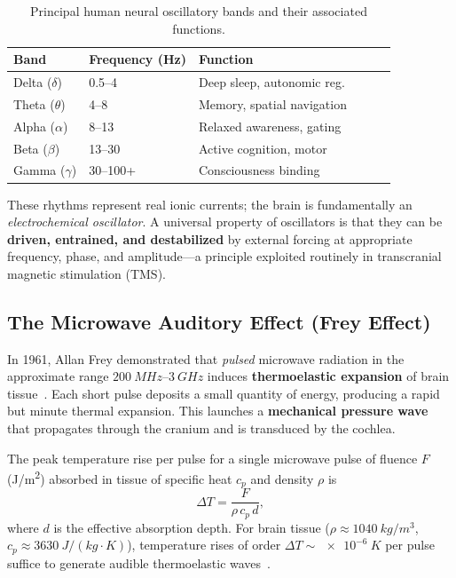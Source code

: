 \documentclass[aps,prl,twocolumn,superscriptaddress,showpacs]{revtex4-2}
\begin{document}
\begin{table}[h]
\caption{\label{tab:bands}
Principal human neural oscillatory bands and their associated functions.}
\begin{tabular}{llllll}
\toprule
\textrm{Band} & \textrm{Frequency (Hz)} & \textrm{Function} \\
\midrule
Delta ($\delta$)  & 0.5--4   & Deep sleep, autonomic reg. \\
Theta ($\theta$)  & 4--8     & Memory, spatial navigation \\
Alpha ($\alpha$)  & 8--13    & Relaxed awareness, gating \\
Beta ($\beta$)    & 13--30   & Active cognition, motor \\
Gamma ($\gamma$)  & 30--100+ & Consciousness binding \\
\bottomrule
\end{tabular}
\end{table}

These rhythms represent real ionic currents; the brain is fundamentally an
\emph{electrochemical oscillator}. A universal property of oscillators is
that they can be \textbf{driven, entrained, and destabilized} by external
forcing at appropriate frequency, phase, and amplitude---a principle
exploited routinely in transcranial magnetic stimulation (TMS).

\subsection{The Microwave Auditory Effect (Frey Effect)}

In 1961, Allan Frey demonstrated that \emph{pulsed} microwave radiation in
the approximate range $\SI{200}{MHz}$--$\SI{3}{GHz}$ induces
\textbf{thermoelastic expansion} of brain tissue~\cite{Frey1961}.
Each short pulse deposits a small quantity of energy, producing a rapid but
minute thermal expansion. This launches a \textbf{mechanical pressure wave}
that propagates through the cranium and is transduced by the cochlea.

The peak temperature rise per pulse for a single microwave pulse of
fluence $F$ (\si{J/m^2}) absorbed in tissue of specific heat $c_p$
and density $\rho$ is
\begin{equation}
\Delta T = \frac{F}{\rho \, c_p \, d},
\label{eq:temp_rise}
\end{equation}
where $d$ is the effective absorption depth. For brain tissue
($\rho \approx \SI{1040}{kg/m^3}$,
$c_p \approx \SI{3630}{J/(kg\cdot K)}$), temperature rises of order
$\Delta T \sim \SI{e-6}{K}$ per pulse suffice to generate audible
thermoelastic waves~\cite{Lin2004}.
\end{document}
